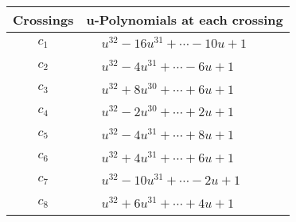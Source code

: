 \documentclass[1p]{elsarticle_modified}
\theoremstyle{definition}
\begin{document}
\begin{tabular}{m{50pt}|m{274pt}}
Crossings & \hspace{64pt}u-Polynomials at each crossing \\
\hline $$\begin{aligned}c_{1}\end{aligned}$$&$\begin{aligned}
&u^{32}-16 u^{31}+\cdots-10 u+1
\end{aligned}$\\
\hline $$\begin{aligned}c_{2}\end{aligned}$$&$\begin{aligned}
&u^{32}-4 u^{31}+\cdots-6 u+1
\end{aligned}$\\
\hline $$\begin{aligned}c_{3}\end{aligned}$$&$\begin{aligned}
&u^{32}+8 u^{30}+\cdots+6 u+1
\end{aligned}$\\
\hline $$\begin{aligned}c_{4}\end{aligned}$$&$\begin{aligned}
&u^{32}-2 u^{30}+\cdots+2 u+1
\end{aligned}$\\
\hline $$\begin{aligned}c_{5}\end{aligned}$$&$\begin{aligned}
&u^{32}-4 u^{31}+\cdots+8 u+1
\end{aligned}$\\
\hline $$\begin{aligned}c_{6}\end{aligned}$$&$\begin{aligned}
&u^{32}+4 u^{31}+\cdots+6 u+1
\end{aligned}$\\
\hline $$\begin{aligned}c_{7}\end{aligned}$$&$\begin{aligned}
&u^{32}-10 u^{31}+\cdots-2 u+1
\end{aligned}$\\
\hline $$\begin{aligned}c_{8}\end{aligned}$$&$\begin{aligned}
&u^{32}+6 u^{31}+\cdots+4 u+1
\end{aligned}$\\

\end{tabular}
\end{document}
